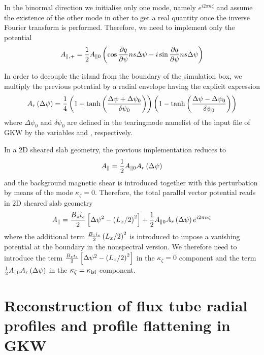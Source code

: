 In the binormal direction we initialise only one mode, namely $e^{i2\pi n\zeta}$ and assume the existence of the other mode in other to get a real quantity once the inverse Fourier transform is performed. Therefore,
 we need to implement only the potential
 \begin{equation}
A_{\parallel,+} = {1\over 2}A_{\parallel 0}\left(\cos{\partial q \over \partial \psi} n s \Delta\psi - i\sin{\partial q \over \partial \psi} n s \Delta\psi\right)
\end{equation}

In order to decouple the island from the boundary of the simulation box, we multiply the previous potential by a radial envelope having the explicit expression
\begin{equation}
A_r\left(\Delta\psi\right) = {1\over 4}\left(1+\tanh\left({\Delta\psi+\Delta\psi_0\over \delta\psi_0}\right)\right)\left(1-\tanh\left({\Delta\psi-\Delta\psi_0\over \delta\psi_0}\right)\right)
\end{equation}
where $\Delta\psi_0$ and $\delta\psi_0$ are defined in the tearingmode namelist of the input file of GKW by the variables  and , respectively.

In a 2D sheared slab geometry, the previous implementation reduces to
\begin{equation}
A_\parallel = {1\over 2}A_{\parallel 0}A_r\left(\Delta\psi\right)
\end{equation}
and the background magnetic shear is introduced together with this perturbation by means of the mode $\kappa_\zeta=0$. Therefore, the total parallel vector potential reads in 2D sheared slab geometry
\begin{equation}
A_\parallel = {B_zi_s\over 2}\left[\Delta\psi^2-\left(L_x/2\right)^2\right]+{1\over 2}A_{\parallel 0}A_r\left(\Delta\psi\right)e^{i2\pi n\zeta}
\end{equation}
where the additional term ${B_zi_s\over 2}\left(L_x/2\right)^2$ is introduced to impose a vanishing potential at the boundary in the nonspectral version. We therefore need to introduce the term ${B_zi_s\over 2}\left[\Delta\psi^2-\left(L_x/2\right)^2\right]$ in the $\kappa_\zeta=0$ component and the term ${1\over 2}A_{\parallel 0}A_r\left(\Delta\psi\right)$ in the $\kappa_\zeta = \kappa_{\rm isl}$ component.

\section{Reconstruction of flux tube radial profiles \label{profiles} and profile flattening in GKW}

